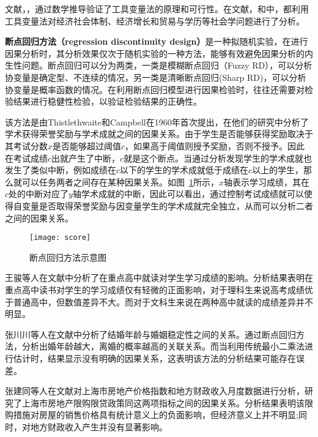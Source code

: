 文献\cite{arellano1995another}，\cite{nelson1988some}，\cite{cragg1993testing}通过数学推导验证了工具变量法的原理和可行性。在文献\cite{陈林2012中国地区性行政垄断与区域经济绩效}，\cite{方颖2011寻找制度的工具变量}和\cite{陈昊2014出口贸易与学历误配}中，都利用工具变量法对经济社会体制、经济增长和贸易与学历等社会学问题进行了分析。

\textbf{断点回归方法（regression discontinuity design）}是一种拟随机实验，在进行因果分析时，其分析效果仅次于随机实验的一种方法，能够有效避免因果分析的内生性问题\cite{余静文2011新}。断点回归可以分为两类，一类是模糊断点回归（Fuzzy RD），可以分析协变量是确定型、不连续的情况，另一类是清晰断点回归(Sharp RD)，可以分析协变量是概率函数的情况\cite{imbens2008regression}。在利用断点回归模型进行因果检验时，往往还需要对检验结果进行稳健性检验，以验证检验结果的正确性。

该方法是由Thistlethwaite和Campbell在1960年首次提出\cite{thistlethwaite1960regression}，在他们的研究中分析了学术获得荣誉奖励与学术成就之间的因果关系。由于学生是否能够获得奖励取决于其考试分数$x$是否能够超过阈值$c$，如果高于阈值则授予奖励，否则不授予。因此在考试成绩$c$出就产生了中断，$c$就是这个断点。当通过分析发现学生的学术成就也发生了类似中断，例如成绩在$c$以下的学生的学术成就低于成绩在$c$以上的学生，那么就可以任务两者之间存在某种因果关系。如图~\ref{score}所示，$x$轴表示学习成绩，其在$c$处的中断对应了$y$轴学术成就的中断，因此可以看出，通过控制考试成绩就可以使得自变量是否取得荣誉奖励与因变量学生的学术成就完全独立，从而可以分析二者之间的因果关系。

\begin{figure}[h] 
  \centering
  \texttt{[image: score]}
  \caption{断点回归方法示意图\cite{lee2010regression}}
  \label{score}
\end{figure}

王骏等人在文献\cite{王骏2015重点高中能否提高学生的学业成绩}中分析了在重点高中就读对学生学习成绩的影响。分析结果表明在重点高中读书对学生的学习成绩仅有轻微的正面影响，对于理科生来说高考成绩优于普通高中，但数值差异不大。而对于文科生来说在两种高中就读的成绩差异并不明显。

张川川等人在文献\cite{zhang2012结婚年龄与婚姻的稳定性}中分析了结婚年龄与婚姻稳定性之间的关系。通过断点回归方法，分析出婚年龄越大，离婚的概率越高的关联关系。而当利用传统最小二乘法进行估计时，结果显示没有明确的因果关系，这表明该方法的分析结果可能存在误差。

张建同等人在文献\cite{张建同2015上海市房地产限购限贷政策评估}对上海市房地产价格指数和地方财政收入月度数据进行分析，研究了上海市房地产限购限贷政策同这两项指标之间的因果关系。分析结果表明该限购措施对房屋的销售价格具有统计意义上的负面影响，但经济意义上并不明显;同时，对地方财政收入产生并没有显著影响。


